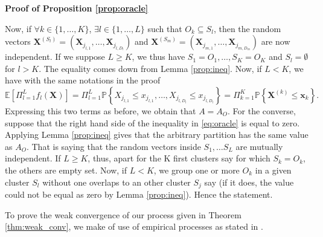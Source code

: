 \documentclass[11pt]{article}
\makeatletter
\renewenvironment{proof}[1][\proofname]{\par
\pushQED{\qed}%
\normalfont \topsep6\p@\@plus6\p@\relax
\trivlist
\item\relax
{\textbf{
#1\@addpunct{ }}}\hspace\labelsep\ignorespaces
}{%
\popQED\endtrivlist\@endpefalse
}
\makeatother
\begin{document}
\begin{proof}[Proof of Proposition \ref{prop:oracle}]
		
		Now, if $\forall k \in \{1,\dots, K\}$, $\exists l \in \{1, \dots, L\}$ such that $O_k \subseteq S_l$, then the random vectors $\textbf{X}^{(S_l)} = (\textbf{X}_{j_{l,1}}, \dots, \textbf{X}_{j_{l,D_l}})$ and $\textbf{X}^{(S_m)} = (\textbf{X}_{j_{m,1}}, \dots, \textbf{X}_{j_{m,D_m}})$ are now independent. If we suppose $L \geq K$, we thus have $S_1 = O_1, \dots, S_K = O_K$ and $S_{l} = \emptyset$ for $l > K$. The equality comes down from Lemma \ref{prop:ineq}. Now, if $L < K$, we have with the same notations in the proof
		\begin{equation*}
			\mathbb{E}\left[ \Pi_{l=1}^L f_l(\textbf{X}) \right] = \Pi_{l=1}^L \mathbb{P}\left\{ X_{j_{l,1}} \leq x_{j_{l,1}}, \dots, X_{j_{l,D_l}} \leq x_{j_{l,D_l}}\right\} = \Pi_{k=1}^K \mathbb{P}\left\{ \textbf{X}^{(k)} \leq \textbf{x}_k \right\}.
		\end{equation*}
		Expressing this two terms as before, we obtain that $A = A_{O}$. For the converse, suppose that the right hand side of the inequality in \eqref{eq:oracle} is equal to zero. Applying Lemma \ref{prop:ineq} gives that the arbitrary partition has the same value as $A_{O}$. That is saying that the random vectors inside $S_1, \dots S_L$ are mutually independent. If $L \geq K$, thus, apart for the K first clusters say for which $S_k = O_k$, the others are empty set. Now, if $L < K$, we group one or more $O_k$ in a given cluster $S_l$ without one overlaps to an other cluster $S_j$ say (if it does, the value could not be equal as zero by Lemma \ref{prop:ineq}). Hence the statement.
	\end{proof}
	
	To prove the weak convergence of our process given in Theorem \ref{thm:weak_conv}, we make of use of empirical processes as stated in \cite{bestbook}.
	
\end{document}
